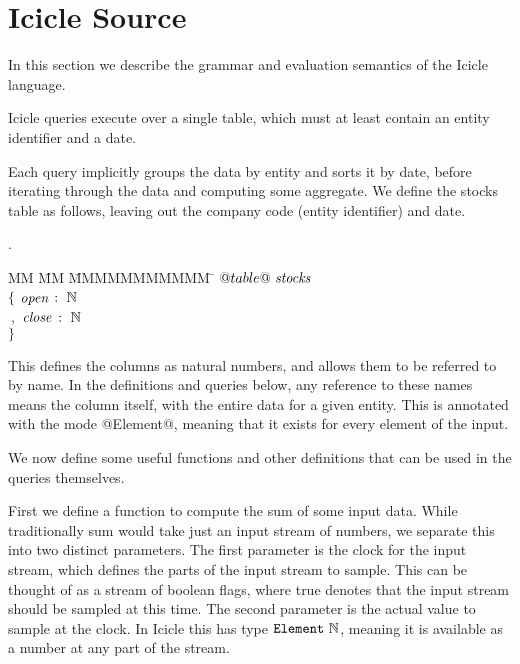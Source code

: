 \section{Icicle Source}
\label{s:Source}

In this section we describe the grammar and evaluation semantics of the Icicle language.

Icicle queries execute over a single table, which must at least contain an entity identifier and a date. 

Each query implicitly groups the data by entity and sorts it by date, before iterating through the data and computing some aggregate.
We define the stocks table as follows, leaving out the company code (entity identifier) and date.

.
\begin{tabbing}
MM \= MM \= MMMMMMMMMMM \= \kill
$@table@~\mathit{stocks}$    \\
$\{$ \> $\mathit{open}$ \> $:~\mathbb{N}$ \\
$~,$ \> $\mathit{close}$ \> $:~\mathbb{N}$ \\
$\}$
\end{tabbing}

This defines the columns as natural numbers, and allows them to be referred to by name.
In the definitions and queries below, any reference to these names means the column itself, with the entire data for a given entity.
This is annotated with the mode @Element@, meaning that it exists for every element of the input.

We now define some useful functions and other definitions that can be used in the queries themselves.

First we define a function to compute the sum of some input data.
While traditionally sum would take just an input stream of numbers, we separate this into two distinct parameters.
The first parameter is the clock for the input stream, which defines the parts of the input stream to sample.
This can be thought of as a stream of boolean flags, where true denotes that the input stream should be sampled at this time.
The second parameter is the actual value to sample at the clock.
In Icicle this has type $\mathtt{Element}~\mathbb{N}$, meaning it is available as a number at any part of the stream.

